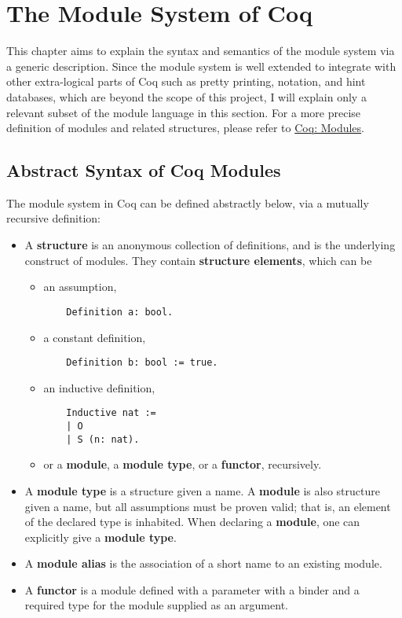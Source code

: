 \chapter{The Module System of Coq}

This chapter aims to explain the syntax and semantics of the module system via
a generic description. Since the module system is well extended to integrate
with other extra-logical parts of Coq such as pretty printing, notation, and 
hint databases, which are beyond the scope of this project, I will
explain only a relevant subset of the module language in this section.
For a more precise definition of modules and related structures, please refer to
\href{https://coq.inria.fr/refman/language/core/modules.html}{Coq: Modules}.

\section{Abstract Syntax of Coq Modules}
The module system in Coq can be defined abstractly below, via a mutually
recursive definition:
\begin{itemize}
\item A \textbf{structure} is an anonymous collection of definitions, and is the 
    underlying construct of modules. They contain \textbf{structure elements},
    which can be
    \begin{itemize}
    \item an assumption,
    \begin{verbatim}
    Definition a: bool.
    \end{verbatim}
    \item a constant definition,
    \begin{verbatim}
    Definition b: bool := true.
    \end{verbatim}
    \item an inductive definition,
    \begin{verbatim}
    Inductive nat :=
    | O
    | S (n: nat).
    \end{verbatim}
    \item or a \textbf{module}, a \textbf{module type}, or a \textbf{functor}, recursively.
    \end{itemize}

\item
    A \textbf{module type} is a structure given a name.
    A \textbf{module} is also structure given a name, but all assumptions must
      be proven valid; that is, an element of the declared type is inhabited.
    When declaring a \textbf{module}, one can explicitly give a \textbf{module type}.
\item A \textbf{module alias} is the association of a short name to an existing
    module.
\item A \textbf{functor} is a module defined with a parameter with a binder and
    a required type for the module supplied as an argument.
\end{itemize}



